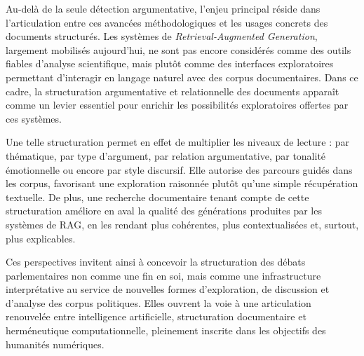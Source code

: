 \documentclass[final, fra]{anthology-ch}      %
\begin{document}
Au-delà de la seule détection argumentative, l’enjeu principal réside dans l’articulation entre ces avancées méthodologiques et les usages concrets des documents structurés. Les systèmes de \textit{Retrieval-Augmented Generation}\cite{lewis2020}, largement mobilisés aujourd’hui, ne sont pas encore considérés comme des outils fiables d’analyse scientifique, mais plutôt comme des interfaces exploratoires permettant d’interagir en langage naturel avec des corpus documentaires. Dans ce cadre, la structuration argumentative et relationnelle des documents apparaît comme un levier essentiel pour enrichir les possibilités exploratoires offertes par ces systèmes.

Une telle structuration permet en effet de multiplier les niveaux de lecture : par thématique, par type d’argument, par relation argumentative, par tonalité émotionnelle ou encore par style discursif. Elle autorise des parcours guidés dans les corpus, favorisant une exploration raisonnée plutôt qu’une simple récupération textuelle. De plus, une recherche documentaire tenant compte de cette structuration améliore en aval la qualité des générations produites par les systèmes de RAG, en les rendant plus cohérentes, plus contextualisées et, surtout, plus explicables.

Ces perspectives invitent ainsi à concevoir la structuration des débats parlementaires non comme une fin en soi, mais comme une infrastructure interprétative au service de nouvelles formes d’exploration, de discussion et d’analyse des corpus politiques. Elles ouvrent la voie à une articulation renouvelée entre intelligence artificielle, structuration documentaire et herméneutique computationnelle, pleinement inscrite dans les objectifs des humanités numériques.

\printbibliography
\end{document}
